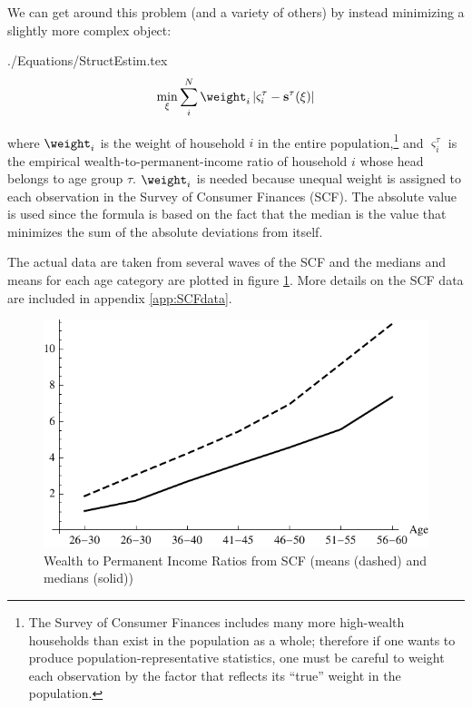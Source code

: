 \documentclass[titlepage]{\econtex}
\begin{document}
We can get around this problem (and a variety of others) by instead minimizing a slightly more complex object:
\begin{verbatimwrite}{./Equations/StructEstim.tex}
\begin{equation}
    \min_{\xi}\sum\limits_{i}^{N}\weight _{i}\left|\varsigma_{i}^{\tau }-\mathbf{s}^{\tau}(\xi )\right|\label{eq:StructEstim}
\end{equation}
\end{verbatimwrite}

where $\weight_{i}$ is the weight of household $i$ in the entire
population,\footnote{The Survey of Consumer Finances includes many
  more high-wealth households than exist in the population as a whole;
  therefore if one wants to produce population-representative
  statistics, one must be careful to weight each observation by the
  factor that reflects its ``true'' weight in the population.} and
$\varsigma_{i}^{\tau }$ is the empirical wealth-to-permanent-income
ratio of household $i$ whose head belongs to age group
$\tau$. $\weight _{i}$ is needed because unequal weight is assigned to
each observation in the Survey of Consumer Finances (SCF). The
absolute value is used since the formula is based on the fact that the
median is the value that minimizes the sum of the absolute deviations
from itself.


The actual data are taken from several waves of the SCF and the medians and means for each age category are plotted in figure \ref{fig:MeanMedianSCF}. More details on the SCF data are included in appendix \ref{app:SCFdata}.
\hypertarget{PlotMeanMedianSCFcollegeGrads}{}
\begin{figure}
    \includegraphics{./Figures/PlotMeanMedianSCFcollegeGrads}
    \caption{Wealth to Permanent Income Ratios from SCF (means (dashed) and medians (solid))}
    \label{fig:MeanMedianSCF}
\end{figure}
\end{document}
